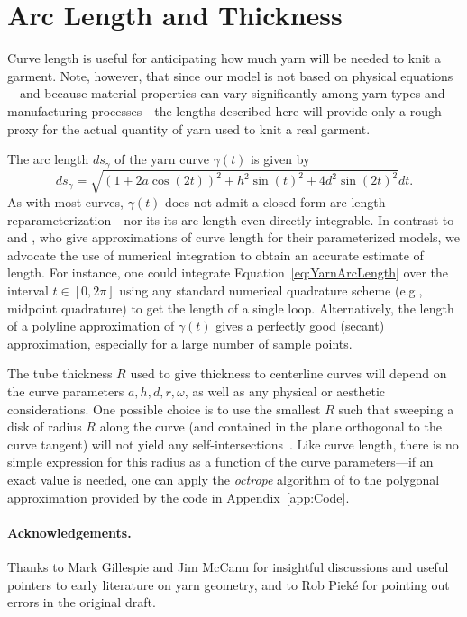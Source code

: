 \documentclass{article}
\begin{document}
\section{Arc Length and Thickness}
\label{sec:ArcLengthAndThickness}

Curve length is useful for anticipating how much yarn will be needed to knit a garment.  Note, however, that since our model is not based on physical equations---and because material properties can vary significantly among yarn types and manufacturing processes---the lengths described here will provide only a rough proxy for the actual quantity of yarn used to knit a real garment.

The arc length \(ds_\gamma\) of the yarn curve \(\gamma(t)\) is given by
\begin{equation}
   \label{eq:YarnArcLength}
   ds_\gamma = \sqrt{(1 + 2a\cos(2 t))^2 + h^2\sin(t)^2 + 4 d^2\sin(2t)^2} dt.
\end{equation}
As with most curves, \(\gamma(t)\) does not admit a closed-form arc-length reparameterization---nor its its arc length even directly integrable.  In contrast to \cite{Peirce:1947:GPA} and \cite{Leaf:1955:GPK}, who give approximations of curve length for their parameterized models, we advocate the use of numerical integration to obtain an accurate estimate of length.  For instance, one could integrate Equation~\ref{eq:YarnArcLength} over the interval \(t \in [0,2\pi]\) using any standard numerical quadrature scheme (e.g., midpoint quadrature) to get the length of a single loop.  Alternatively, the length of a polyline approximation of \(\gamma(t)\) gives a perfectly good (secant) approximation, especially for a large number of sample points.

The tube thickness \(R\) used to give thickness to centerline curves will depend on the curve parameters \(a,h,d,r,\omega\), as well as any physical or aesthetic considerations.  One possible choice is to use the smallest \(R\) such that sweeping a disk of radius \(R\) along the curve (and contained in the plane orthogonal to the curve tangent) will not yield any self-intersections~\cite[Section 3]{gonzalez1999global}.  Like curve length, there is no simple expression for this radius as a function of the curve parameters---if an exact value is needed, one can apply the \emph{octrope} algorithm of \citet{ashton2005fast} to the polygonal approximation provided by the code in Appendix~\ref{app:Code}.

\mbox{}

\paragraph{Acknowledgements.} Thanks to Mark Gillespie and Jim McCann for insightful discussions and useful pointers to early literature on yarn geometry, and to Rob Piek\'{e} for pointing out errors in the original draft.
\end{document}
